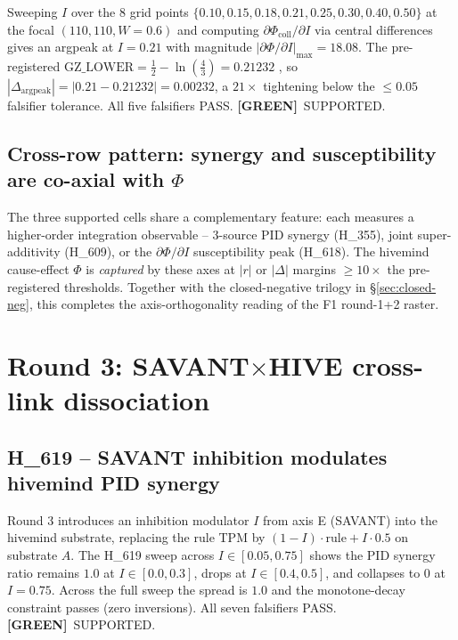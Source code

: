 \documentclass[11pt,a4paper]{article}
\providecommand{\tierGreen}{\textbf{[GREEN]}}
\begin{document}
Sweeping $I$ over the 8 grid points $\{0.10, 0.15, 0.18, 0.21, 0.25,
0.30, 0.40, 0.50\}$ at the focal $(110, 110, W{=}0.6)$ and computing
$\partial \Phi_{\mathrm{coll}} / \partial I$ via central differences
gives an argpeak at $I = 0.21$ with magnitude
$|\partial \Phi/\partial I|_{\max} = 18.08$.
The pre-registered $\mathrm{GZ\_LOWER} = \tfrac{1}{2} - \ln(\tfrac{4}{3})
= 0.21232$ \citep{anima_H348}, so
$|\Delta_{\mathrm{argpeak}}| = |0.21 - 0.21232| = 0.00232$, a
$21\times$ tightening below the $\leq 0.05$ falsifier tolerance. All
five falsifiers PASS. \tierGreen\ SUPPORTED.

\subsection{Cross-row pattern: synergy and susceptibility are co-axial with $\Phi$}

The three supported cells share a complementary feature: each measures
a higher-order integration observable -- 3-source PID synergy (H\_355),
joint super-additivity (H\_609), or the $\partial\Phi/\partial I$
susceptibility peak (H\_618). The hivemind cause-effect $\Phi$ is
\emph{captured} by these axes at $|r|$ or $|\Delta|$ margins
$\geq 10\times$ the pre-registered thresholds. Together with the
closed-negative trilogy in \S\ref{sec:closed-neg}, this completes the
axis-orthogonality reading of the F1 round-1+2 raster.

\section{Round 3: SAVANT$\times$HIVE cross-link dissociation}
\label{sec:dissoc}

\subsection{H\_619 -- SAVANT inhibition modulates hivemind PID synergy}

Round 3 introduces an inhibition modulator $I$ from axis E (SAVANT)
into the hivemind substrate, replacing the rule
TPM by $(1-I) \cdot \mathrm{rule} + I \cdot 0.5$ on substrate $A$.
The H\_619 sweep across $I \in [0.05, 0.75]$ shows the PID synergy
ratio remains $1.0$ at $I \in [0.0, 0.3]$, drops at $I \in [0.4, 0.5]$,
and collapses to $0$ at $I = 0.75$. Across the full sweep the spread
is $1.0$ and the monotone-decay constraint passes
(zero inversions). All seven falsifiers PASS.
\tierGreen\ SUPPORTED.
\end{document}
